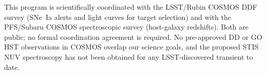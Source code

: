 \documentclass[12pt]{article}
\begin{document}

\coordinatedobs %

This program is scientifically coordinated with the LSST/Rubin COSMOS
DDF survey (SNe~Ia alerts and light curves for target selection) and
with the PFS/Subaru COSMOS spectroscopic survey (host-galaxy redshifts).
Both are public; no formal coordination agreement is required. No
pre-approved DD or GO HST observations in COSMOS overlap our science
goals, and the proposed STIS NUV spectroscopy has not been obtained
for any LSST-discovered transient to date.




{\small


}
\end{document}
